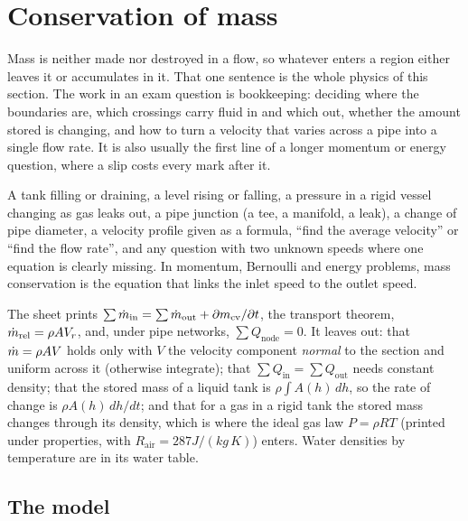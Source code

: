 \section{Conservation of mass}
\label{sec:mass}

Mass is neither made nor destroyed in a flow, so whatever enters a region either leaves it or accumulates in it. That one sentence is the whole physics of this section. The work in an exam question is bookkeeping: deciding where the boundaries are, which crossings carry fluid in and which out, whether the amount stored is changing, and how to turn a velocity that varies across a pipe into a single flow rate. It is also usually the first line of a longer momentum or energy question, where a slip costs every mark after it.

\begin{recognise}
A tank filling or draining, a level rising or falling, a pressure in a rigid vessel changing as gas leaks out, a pipe junction (a tee, a manifold, a leak), a change of pipe diameter, a velocity profile given as a formula, ``find the average velocity'' or ``find the flow rate'', and any question with two unknown speeds where one equation is clearly missing. In momentum, Bernoulli and energy problems, mass conservation is the equation that links the inlet speed to the outlet speed.
\end{recognise}

\begin{onsheet}
The sheet prints $\sum\dot m_\text{in} = \sum\dot m_\text{out} + \partial m_\text{cv}/\partial t$, the transport theorem, $\dot m_\text{rel} = \rho AV_r$, and, under pipe networks, $\sum Q_\text{node} = 0$. It leaves out: that $\dot m = \rho AV$ holds only with $V$ the velocity component \emph{normal} to the section and uniform across it (otherwise integrate); that $\sum Q_\text{in} = \sum Q_\text{out}$ needs constant density; that the stored mass of a liquid tank is $\rho\int A(h)\,dh$, so the rate of change is $\rho A(h)\,dh/dt$; and that for a gas in a rigid tank the stored mass changes through its density, which is where the ideal gas law $P = \rho RT$ (printed under properties, with $R_\text{air} = 287\unit{J/(kg\,K)}$) enters. Water densities by temperature are in its water table.
\end{onsheet}

\subsection*{The model}

